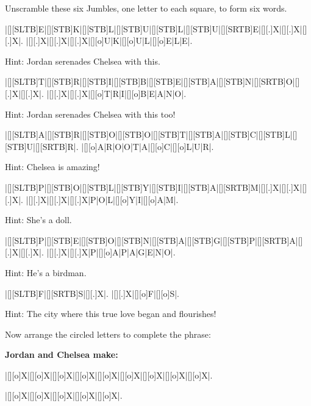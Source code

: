 Unscramble these six Jumbles, one letter to each square, to form six words.\\

\begin{Puzzle}{10}{2}
|[][SLTB]E|[][STB]K|[][STB]L|[][STB]U|[][STB]L|[][STB]U|[][SRTB]E|[][.]X|[][.]X|[][.]X|.
|[][.]X|[][.]X|[][.]X|[][o]U|K|[][o]U|L|[][o]E|L|E|.
\end{Puzzle}
Hint: Jordan serenades Chelsea with this.\bigskip

\begin{Puzzle}{10}{2}
|[][SLTB]T|[][STB]R|[][STB]I|[][STB]B|[][STB]E|[][STB]A|[][STB]N|[][SRTB]O|[][.]X|[][.]X|.
|[][.]X|[][.]X|[][o]T|R|I|[][o]B|E|A|N|O|.
\end{Puzzle}
Hint: Jordan serenades Chelsea with this too!\bigskip

\begin{Puzzle}{10}{2}
|[][SLTB]A|[][STB]R|[][STB]O|[][STB]O|[][STB]T|[][STB]A|[][STB]C|[][STB]L|[][STB]U|[][SRTB]R|.
|[][o]A|R|O|O|T|A|[][o]C|[][o]L|U|R|.
\end{Puzzle}
Hint: Chelsea is amazing!\bigskip

\begin{Puzzle}{10}{2}
|[][SLTB]P|[][STB]O|[][STB]L|[][STB]Y|[][STB]I|[][STB]A|[][SRTB]M|[][.]X|[][.]X|[][.]X|.
|[][.]X|[][.]X|[][.]X|P|O|L|[][o]Y|I|[][o]A|M|.
\end{Puzzle}
Hint: She's a doll.\bigskip

\begin{Puzzle}{10}{2}
|[][SLTB]P|[][STB]E|[][STB]O|[][STB]N|[][STB]A|[][STB]G|[][STB]P|[][SRTB]A|[][.]X|[][.]X|.
|[][.]X|[][.]X|P|[][o]A|P|A|G|E|N|O|.
\end{Puzzle}
Hint: He's a birdman.\bigskip

\begin{Puzzle}{10}{2}
|[][SLTB]F|[][SRTB]S|[][.]X|.
|[][.]X|[][o]F|[][o]S|.
\end{Puzzle}
Hint: The city where this true love began and flourishes!\bigskip

Now arrange the circled letters to complete the phrase:\bigskip

{\bf Jordan and Chelsea make:}\bigskip

\begin{Puzzle}{10}{1}
|[][o]X|[][o]X|[][o]X|[][o]X|[][o]X|[][o]X|[][o]X|[][o]X|[][o]X|.
\end{Puzzle}

\begin{Puzzle}{10}{1}
|[][o]X|[][o]X|[][o]X|[][o]X|[][o]X|.
\end{Puzzle}

